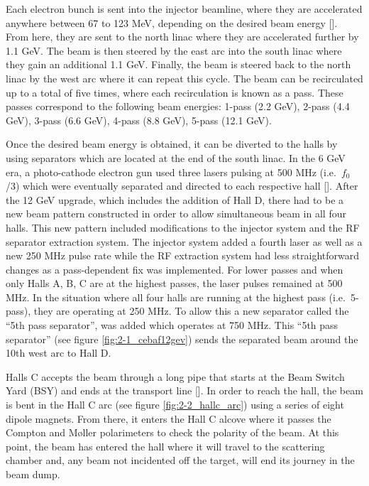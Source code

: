 \documentclass[
]{report}
\begin{document}


Each electron bunch is sent into the injector beamline, where they are
accelerated anywhere between 67 to 123 MeV, depending on the desired
beam energy {[}\cite{pilat_12_2012}{]}. From here, they are sent to the
north linac where they are accelerated further by 1.1 GeV. The beam is
then steered by the east arc into the south linac where they gain an
additional 1.1 GeV. Finally, the beam is steered back to the north linac
by the west arc where it can repeat this cycle. The beam can be
recirculated up to a total of five times, where each recirculation is
known as a pass. These passes correspond to the following beam energies:
1-pass (2.2 GeV), 2-pass (4.4 GeV), 3-pass (6.6 GeV), 4-pass (8.8 GeV),
5-pass (12.1 GeV).

Once the desired beam energy is obtained, it can be diverted to the
halls by using separators which are located at the end of the south
linac. In the 6 GeV era, a photo-cathode electron gun used three lasers
pulsing at 500 MHz (i.e.~\(f_0\)/3) which were eventually separated and
directed to each respective hall {[}\cite{kazimi_operational_2019}{]}.
After the 12 GeV upgrade, which includes the addition of Hall D, there
had to be a new beam pattern constructed in order to allow simultaneous
beam in all four halls. This new pattern included modifications to the
injector system and the RF separator extraction system. The injector
system added a fourth laser as well as a new 250 MHz pulse rate while
the RF extraction system had less straightforward changes as a
pass-dependent fix was implemented. For lower passes and when only Halls
A, B, C are at the highest passes, the laser pulses remained at 500 MHz.
In the situation where all four halls are running at the highest pass
(i.e.~5-pass), they are operating at 250 MHz. To allow this a new
separator called the ``5th pass separator'', was added which operates at
750 MHz. This ``5th pass separator'' (see figure
\ref{fig:2-1_cebaf12gev}) sends the separated beam around the 10th west
arc to Hall D.

\label{Chapter-2-2}

Halls C accepts the beam through a long pipe that starts at the Beam
Switch Yard (BSY) and ends at the transport line
{[}\cite{sta_jeerson_2019}{]}. In order to reach the hall, the beam is
bent in the Hall C arc (see figure \ref{fig:2-2_hallc_arc}) using a
series of eight dipole magnets. From there, it enters the Hall C alcove
where it passes the Compton and \(\text{M\o{}ller}\) polarimeters to
check the polarity of the beam. At this point, the beam has entered the
hall where it will travel to the scattering chamber and, any beam not
incidented off the target, will end its journey in the beam dump.
\end{document}
